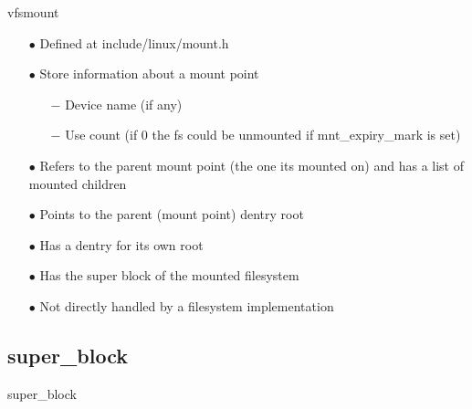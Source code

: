 \documentclass{beamer}
\begin{document}
\begin{frame}{vfsmount}
	
	\begin{itemize}[<+->]

		\item[$\bullet$]{Defined at include/linux/mount.h}	

		\item[$\bullet$]{Store information about a mount point}
			\begin{itemize}
				\item[$-$]{Device name (if any)}
				\item[$-$]{Use count (if 0 the fs could be unmounted if mnt\_expiry\_mark is set) }
			\end{itemize}	
		
		\item[$\bullet$]{Refers to the parent mount point (the one its mounted on) and has a list of mounted children}
		\item[$\bullet$]{Points to the parent (mount point) dentry root}
		\item[$\bullet$]{Has a dentry for its own root}
		\item[$\bullet$]{Has the super block of the mounted filesystem}		
		\item[$\bullet$]{Not directly handled by a filesystem implementation}
		
	\end{itemize}

\end{frame}

\subsection{super\_block}

\begin{frame}{super\_block}
	
	
\end{frame}
\end{document}
